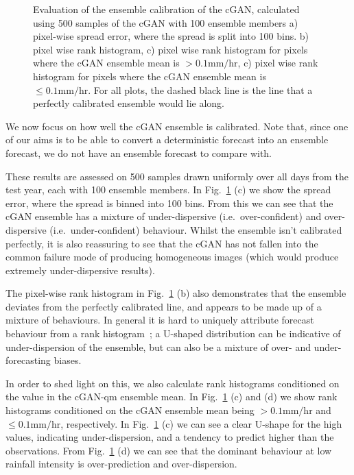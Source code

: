 \documentclass{article}
\begin{document}
\begin{figure}[!ht]
     
     \caption{Evaluation of the ensemble calibration of the cGAN, calculated using 500 samples of the cGAN with 100 ensemble members a) pixel-wise spread error, where the spread is split into 100 bins. b) pixel wise rank histogram, c) pixel wise rank histogram for pixels where the cGAN ensemble mean is $>0.1\text{mm/hr}$, c) pixel wise rank histogram for pixels where the cGAN ensemble mean is $\leq 0.1\text{mm/hr}$. For all plots, the dashed black line is the line that a perfectly calibrated ensemble would lie along. }
     \label{fig:ens_calib}
\end{figure}


We now focus on how well the cGAN ensemble is calibrated. Note that, since one of our aims is to be able to convert a deterministic forecast into an ensemble forecast, we do not have an ensemble forecast to compare with.

These results are assessed on 500 samples drawn uniformly over all days from the test year, each with 100 ensemble members. In Fig.~\ref{fig:ens_calib} (c) we show the spread error, where the spread is binned into 100 bins. From this we can see that the cGAN ensemble has a mixture of under-dispersive (i.e.~over-confident) and over-dispersive (i.e.~under-confident) behaviour. Whilst the ensemble isn't calibrated perfectly, it is also reassuring to see that the cGAN has not fallen into the common failure mode of producing homogeneous images (which would produce extremely under-dispersive results).

The pixel-wise rank histogram in Fig.~\ref{fig:ens_calib} (b) also demonstrates that the ensemble deviates from the perfectly calibrated line, and appears to be made up of a mixture of behaviours. In general it is hard to uniquely attribute forecast behaviour from a rank histogram~\citep{hamill_interpretation_2001}; a U-shaped distribution can be indicative of under-dispersion of the ensemble, but can also be a mixture of over- and under-forecasting biases. 

In order to shed light on this, we also calculate rank histograms conditioned on the value in the cGAN-qm ensemble mean. In Fig.~\ref{fig:ens_calib} (c) and (d) we show rank histograms conditioned on the cGAN ensemble mean being $>0.1\text{mm/hr}$ and $\leq 0.1\text{mm/hr}$, respectively. In Fig.~\ref{fig:ens_calib} (c) we can see a clear U-shape for the high values, indicating under-dispersion, and a tendency to predict higher than the observations. From Fig.~\ref{fig:ens_calib} (d) we can see that the dominant behaviour at low rainfall intensity is over-prediction and over-dispersion. 
\end{document}
